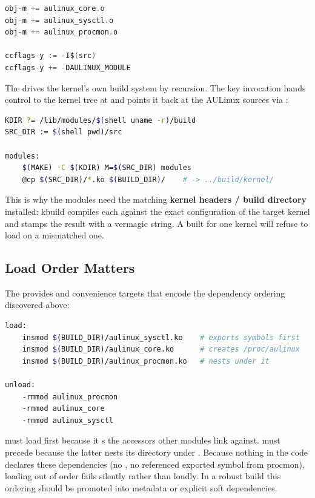 \begin{lstlisting}[language=C, caption={Module targets in src/Kbuild}]
obj-m += aulinux_core.o
obj-m += aulinux_sysctl.o
obj-m += aulinux_procmon.o

ccflags-y := -I$(src)
ccflags-y += -DAULINUX_MODULE
\end{lstlisting}

The  drives the kernel's own build system by recursion. The key
invocation hands control to the kernel tree at  and points it back at
the AULinux sources via :

\begin{lstlisting}[language=bash, caption={The out-of-tree build recursion (Makefile)}]
KDIR ?= /lib/modules/$(shell uname -r)/build
SRC_DIR := $(shell pwd)/src

modules:
	$(MAKE) -C $(KDIR) M=$(SRC_DIR) modules
	@cp $(SRC_DIR)/*.ko $(BUILD_DIR)/    # -> ../build/kernel/
\end{lstlisting}

This is why the modules need the matching \textbf{kernel headers / build
directory} installed: kbuild compiles each  against the exact
configuration of the target kernel and stamps the result with a vermagic string.
A  built for one kernel will refuse to load on a mismatched one.

\subsection{Load Order Matters}

The  provides  and  convenience targets
that encode the dependency ordering discovered above:

\begin{lstlisting}[language=bash, caption={Ordered insmod / rmmod (Makefile)}]
load:
	insmod $(BUILD_DIR)/aulinux_sysctl.ko    # exports symbols first
	insmod $(BUILD_DIR)/aulinux_core.ko      # creates /proc/aulinux
	insmod $(BUILD_DIR)/aulinux_procmon.ko   # nests under it

unload:
	-rmmod aulinux_procmon
	-rmmod aulinux_core
	-rmmod aulinux_sysctl
\end{lstlisting}

\begin{warnbox}
 must load first because it s the
accessors other modules link against.  must precede
 because the latter nests its directory under
. Because nothing in the code declares these dependencies
(no , no referenced exported symbol from procmon), loading
out of order fails silently rather than loudly. In a robust build this ordering
should be promoted into  metadata or explicit soft dependencies.
\end{warnbox}


